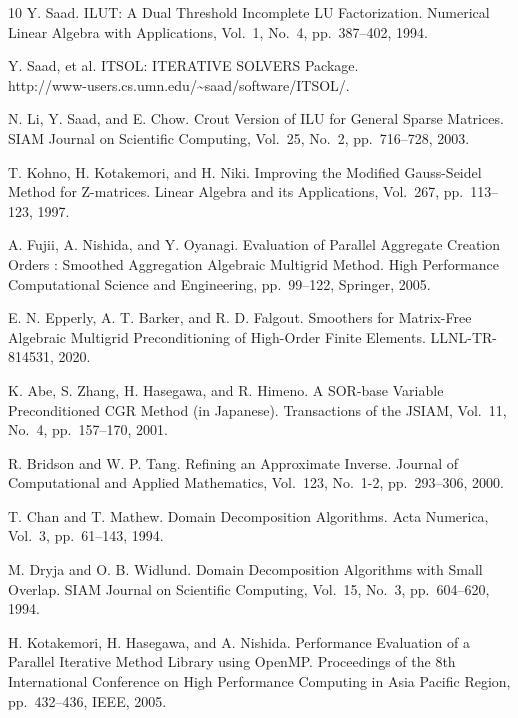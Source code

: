 \documentclass[a4paper]{article}
\begin{document}
\begin{thebibliography}{10}
Y. Saad.
\newblock ILUT: A Dual Threshold Incomplete LU Factorization.
\newblock Numerical Linear Algebra with Applications, Vol.~1, No.~4, pp.\ 387--402, 1994. 

Y. Saad, et al.
\newblock ITSOL: ITERATIVE SOLVERS Package. \\
\newblock http://www-users.cs.umn.edu/\textasciitilde saad/software/ITSOL/.

N. Li, Y. Saad, and E. Chow.
\newblock Crout Version of ILU for General Sparse Matrices.
\newblock SIAM Journal on Scientific Computing, Vol.~25, No.~2, pp.\ 716--728, 2003. 

T. Kohno, H. Kotakemori, and H. Niki.
\newblock Improving the Modified Gauss-Seidel Method for Z-matrices.
\newblock Linear Algebra and its Applications, Vol.~267, pp.\ 113--123, 1997.

A. Fujii, A. Nishida, and Y. Oyanagi.
\newblock Evaluation of Parallel Aggregate Creation Orders : Smoothed Aggregation Algebraic Multigrid Method.
\newblock High Performance Computational Science and Engineering, pp.\ 99--122, Springer, 2005.

E. N. Epperly, A. T. Barker, and R. D. Falgout.
\newblock Smoothers for Matrix-Free Algebraic Multigrid Preconditioning of High-Order Finite Elements.
\newblock LLNL-TR-814531, 2020.

K. Abe, S. Zhang, H. Hasegawa, and R. Himeno.
\newblock A SOR-base Variable Preconditioned CGR Method (in Japanese).
\newblock Transactions of the JSIAM,  Vol.~11, No.~4, pp.\ 157--170, 2001.

R. Bridson and W. P. Tang.
\newblock Refining an Approximate Inverse.
\newblock Journal of Computational and Applied Mathematics, Vol.~123, No.~1-2, pp.\ 293--306, 2000. 

T. Chan and T. Mathew.
\newblock Domain Decomposition Algorithms.
\newblock Acta Numerica, Vol.~3, pp.\ 61--143, 1994. 

M. Dryja and O. B. Widlund.
\newblock Domain Decomposition Algorithms with Small Overlap.
\newblock SIAM Journal on Scientific Computing, Vol.~15, No.~3, pp.\ 604--620, 1994.

H. Kotakemori, H. Hasegawa, and A. Nishida.
\newblock Performance Evaluation of a Parallel Iterative Method Library using OpenMP.
\newblock Proceedings of the 8th International Conference on High
	Performance Computing in Asia Pacific Region, pp.\ 432--436, IEEE, 2005.


\end{thebibliography}
\end{document}

